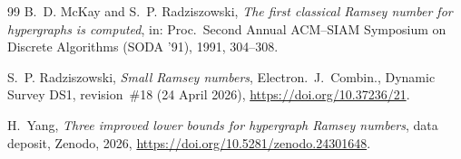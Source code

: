 \documentclass[11pt]{article}
\theoremstyle{remark}
\begin{document}
\begin{thebibliography}{99}
B.~D. McKay and S.~P. Radziszowski,
\emph{The first classical Ramsey number for hypergraphs is computed},
in: Proc.\ Second Annual ACM--SIAM Symposium on Discrete Algorithms (SODA '91),
1991, 304--308.

S.~P. Radziszowski,
\emph{Small Ramsey numbers},
Electron.\ J.\ Combin., Dynamic Survey DS1, revision~\#18 (24 April 2026),
\mbox{\url{https://doi.org/10.37236/21}}.

H.~Yang,
\emph{Three improved lower bounds for hypergraph Ramsey numbers},
data deposit, Zenodo, 2026,
\mbox{\url{https://doi.org/10.5281/zenodo.24301648}}.

\end{thebibliography}
\end{document}
